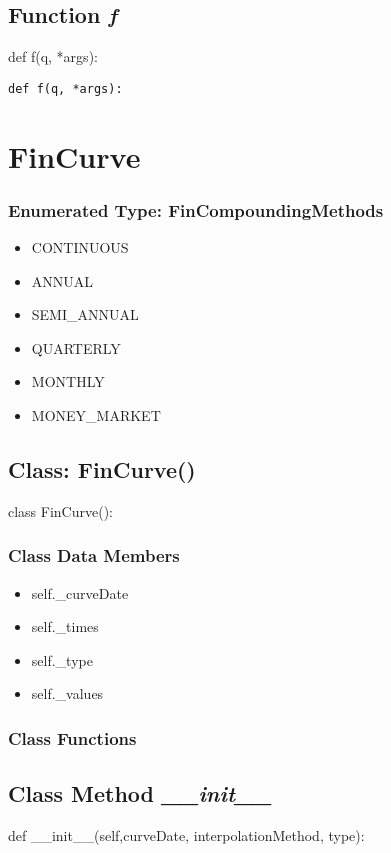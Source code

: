 \documentclass[twoside,11pt]{book}
\begin{document}
\subsection{Function {\it f}}
def f(q, *args):

\begin{lstlisting}
def f(q, *args):
\end{lstlisting}

\newpage
\section{FinCurve}

\subsubsection{Enumerated Type: FinCompoundingMethods}
\begin{itemize}
\item{CONTINUOUS}
\item{ANNUAL}
\item{SEMI\_ANNUAL}
\item{QUARTERLY}
\item{MONTHLY}
\item{MONEY\_MARKET}
\end{itemize}

\subsection{Class: FinCurve()}
class FinCurve():

\subsubsection{Class Data Members}
\begin{itemize}
\item{self.\_curveDate}
\item{self.\_times}
\item{self.\_type}
\item{self.\_values}
\end{itemize}

\subsubsection{Class Functions}

\subsection{Class Method {\it \_\_init\_\_}}
def \_\_init\_\_(self,curveDate, interpolationMethod, type):
\end{document}
